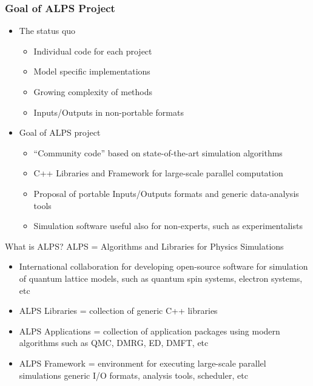 \begin{frame}
  \frametitle{Goal of ALPS Project}
  \begin{itemize}
    \setlength{\itemsep}{1em}
  \item The status quo
    \begin{itemize}
    \item Individual code for each project
    \item Model specific implementations
    \item Growing complexity of methods
    \item Inputs/Outputs in non-portable formats
    \end{itemize}
  \item Goal of ALPS project
    \begin{itemize}
    \item ``Community code'' based on state-of-the-art simulation algorithms
    \item C++ Libraries and Framework for large-scale parallel computation
    \item Proposal of portable Inputs/Outputs formats and generic data-analysis tools
    \item Simulation software useful also for non-experts, such as experimentalists
    \end{itemize}
  \end{itemize}
\end{frame}

\begin{frame}{What is ALPS?}
  ALPS = \alert{A}lgorithms and \alert{L}ibraries for \alert{P}hysics \alert{S}imulations
      \begin{itemize}
      \item International collaboration for developing open-source
        software for simulation of quantum lattice models, such as
        quantum spin systems, electron systems, etc
        \item ALPS Libraries = collection of generic C++ libraries
        \item ALPS Applications = collection of application packages
          using modern algorithms such as QMC, DMRG, ED, DMFT, etc
        \item ALPS Framework = environment for executing large-scale
          parallel simulations generic I/O formats, analysis tools,
          scheduler, etc
      \end{itemize}
\end{frame}

